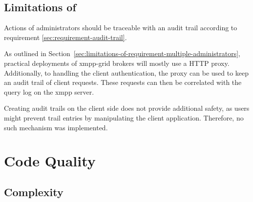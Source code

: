\subsection{Limitations of \emph{}}

Actions of administrators should be traceable with an audit trail according to requirement \ref{sec:requirement-audit-trail}.

As outlined in Section~\ref{sec:limitations-of-requirement-multiple-administrators}, practical deployments of \gls{xmpp-grid} \glspl{broker} will mostly use a HTTP proxy.
Additionally, to handling the client authentication, the proxy can be used to keep an audit trail of client requests.
These requests can then be correlated with the query log on the \gls{xmpp} server.

Creating audit trails on the client side does not provide additional safety, as users might prevent trail entries by manipulating the client application.
Therefore, no such mechanism was implemented.



\section{Code Quality}


\subsection{Complexity}


